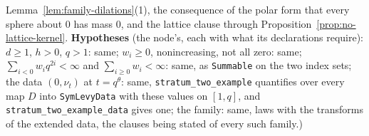 \begin{proposition}
{Lemma~\ref{lem:family-dilations}(1), the consequence of the polar form that every sphere about $0$
has mass $0$, and the lattice clause through Proposition~\ref{prop:no-lattice-kernel}.
\textbf{Hypotheses} (the node's, each with what its declarations require): $d \ge 1$, $h > 0$,
$q > 1$: same; $w_i \ge 0$, nonincreasing, not all zero: same; $\sum_{i<0}w_iq^{2i} < \infty$ and
$\sum_{i \ge 0}w_i < \infty$: same, as \texttt{Summable} on the two index sets; the data
$(0, \nu_t)$ at $t = q^\theta$: same, \texttt{stratum\_two\_example} quantifies over every map $D$
into \texttt{SymLevyData} with these values on $[1,q]$, and \texttt{stratum\_two\_example\_data}
gives one; the family: same, laws with the transforms of the extended data, the clauses being
stated of every such family.)}
\end{proposition}

